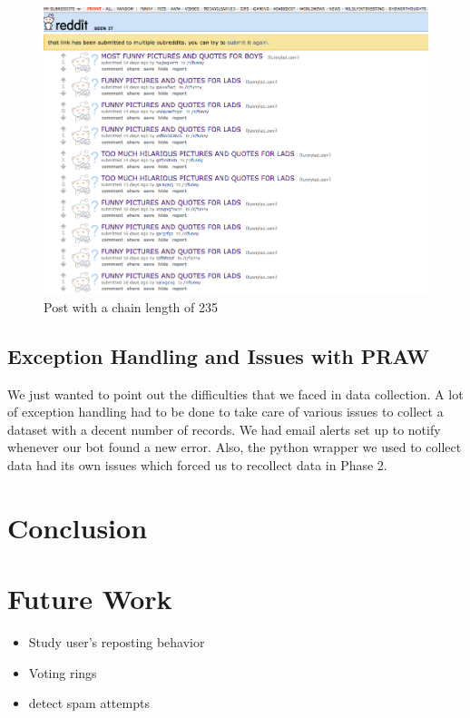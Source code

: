 \documentclass{article} %
\begin{document}
\begin{figure}[h]
\begin{center}
\includegraphics[width=4.5in]{funny.png}
\caption{Post with a chain length of 235}
\end{center}
\end{figure}

\newpage

\subsection{Exception Handling and Issues with PRAW}

We just wanted to point out the difficulties that we faced in data collection. A lot of exception handling had to be done to take care of various issues to collect a dataset with a decent number of records. We had email alerts set up to notify whenever our bot found a new error. Also, the python wrapper we used to collect data had its own issues which forced us to recollect data in Phase 2.

\section{Conclusion}

\section{Future Work}

\begin{itemize}
\item Study user's reposting behavior
\item Voting rings
\item detect spam attempts
\end{itemize}
\end{document}
